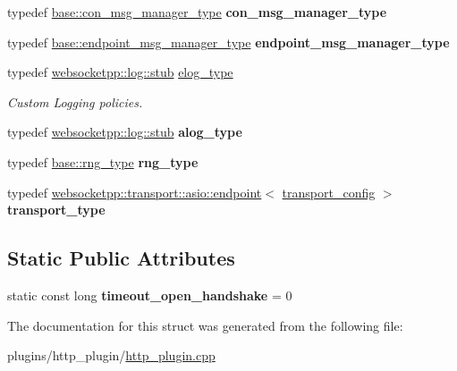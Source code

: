 \begin{DoxyCompactItemize}
typedef \mbox{\hyperlink{classwebsocketpp_1_1message__buffer_1_1alloc_1_1con__msg__manager}{base\+::con\+\_\+msg\+\_\+manager\+\_\+type}} {\bfseries con\+\_\+msg\+\_\+manager\+\_\+type}
\item 
\mbox{\label{structaacio_1_1detail_1_1asio__with__stub__log_a08cf35469fc6982cc2b375a8d20c14c0}} 
typedef \mbox{\hyperlink{classwebsocketpp_1_1message__buffer_1_1alloc_1_1endpoint__msg__manager}{base\+::endpoint\+\_\+msg\+\_\+manager\+\_\+type}} {\bfseries endpoint\+\_\+msg\+\_\+manager\+\_\+type}
\item 
\mbox{\label{structaacio_1_1detail_1_1asio__with__stub__log_a06de2fad8f29b9645ecddda507fa2677}} 
typedef \mbox{\hyperlink{classwebsocketpp_1_1log_1_1stub}{websocketpp\+::log\+::stub}} \mbox{\hyperlink{structaacio_1_1detail_1_1asio__with__stub__log_a06de2fad8f29b9645ecddda507fa2677}{elog\+\_\+type}}
\begin{DoxyCompactList}\small\item\em Custom Logging policies. \end{DoxyCompactList}\item 
\mbox{\label{structaacio_1_1detail_1_1asio__with__stub__log_a539e68b7df48e96f2002b32657b69f3e}} 
typedef \mbox{\hyperlink{classwebsocketpp_1_1log_1_1stub}{websocketpp\+::log\+::stub}} {\bfseries alog\+\_\+type}
\item 
\mbox{\label{structaacio_1_1detail_1_1asio__with__stub__log_a40ee3ee8dcbb06dea62e1013945b3333}} 
typedef \mbox{\hyperlink{structwebsocketpp_1_1config_1_1core_a245db33d05f7994d221db66f506ab8c6}{base\+::rng\+\_\+type}} {\bfseries rng\+\_\+type}
\item 
\mbox{\label{structaacio_1_1detail_1_1asio__with__stub__log_aa3d65c645a5f3055c8d983c520e964bf}} 
typedef \mbox{\hyperlink{classwebsocketpp_1_1transport_1_1asio_1_1endpoint}{websocketpp\+::transport\+::asio\+::endpoint}}$<$ \mbox{\hyperlink{structaacio_1_1detail_1_1asio__with__stub__log_1_1transport__config}{transport\+\_\+config}} $>$ {\bfseries transport\+\_\+type}
\end{DoxyCompactItemize}
\subsection*{Static Public Attributes}
\begin{DoxyCompactItemize}
\item 
\mbox{\label{structaacio_1_1detail_1_1asio__with__stub__log_aaeb57f8afe5d2646a2bb10c797f2e673}} 
static const long {\bfseries timeout\+\_\+open\+\_\+handshake} = 0
\end{DoxyCompactItemize}


The documentation for this struct was generated from the following file\+:\begin{DoxyCompactItemize}
\item 
plugins/http\+\_\+plugin/\mbox{\hyperlink{http__plugin_8cpp}{http\+\_\+plugin.\+cpp}}\end{DoxyCompactItemize}
